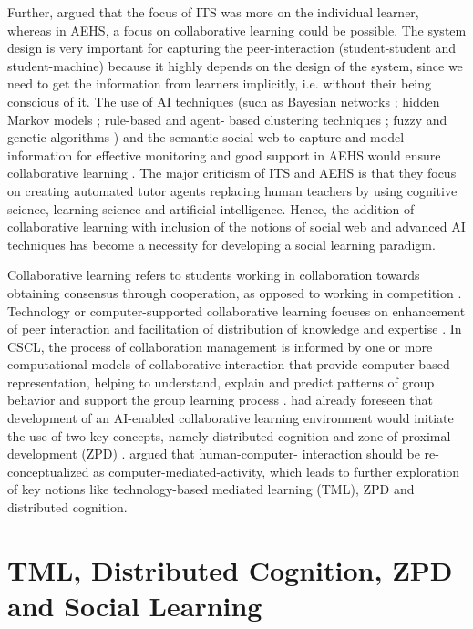\begin{multicols}{2}
Further, \cite{art2-key35} argued that the focus of ITS was more on the individual learner, whereas in AEHS, a focus on collaborative learning could be possible. The system design is very important for capturing the peer-interaction (student-student and student-machine) because it highly depends on the design of the system, since we need to get the information from learners implicitly, i.e. without their being conscious of it. The use of AI techniques (such as Bayesian networks \cite{art2-key41}; hidden Markov models \cite{art2-key47}; rule-based and agent- based clustering techniques \cite{art2-key38}; fuzzy and genetic algorithms \cite{art2-key12}) and the semantic social web \cite{art2-key23} to capture and model information for effective monitoring and good support in AEHS would ensure collaborative learning \cite{art2-key35}. The major criticism of ITS and AEHS is that they focus on creating automated tutor agents replacing human teachers by using cognitive science, learning science and artificial intelligence. Hence, the addition of collaborative learning with inclusion of the notions of social web and advanced AI techniques has become a necessity for developing a social learning paradigm.

Collaborative learning refers to students working in collaboration towards obtaining consensus through cooperation, as opposed to working in competition  \cite{art2-key37}. Technology or computer-supported collaborative learning focuses on enhancement of peer interaction and facilitation of distribution of knowledge and expertise  \cite{art2-key33}. In CSCL, the process of collaboration management is informed by one or more computational models of collaborative interaction that provide computer-based representation, helping to understand, explain and predict patterns of group behavior and support the group learning process  \cite{art2-key48}.  \cite{art2-key36} had already foreseen that development of an AI-enabled collaborative learning environment would initiate the use of two key concepts, namely distributed cognition \cite{art2-key20} and zone of proximal development (ZPD) \cite{art2-key51}. \cite{art2-key24} argued that human-computer- interaction should be re-conceptualized as computer-mediated-activity, which leads to further exploration of key notions like technology-based mediated learning (TML), ZPD and distributed cognition.

\section{TML, Distributed Cognition, ZPD and Social Learning}


\end{multicols}

